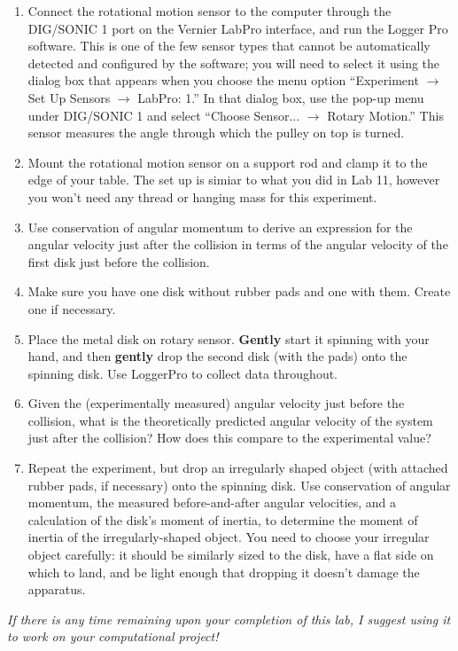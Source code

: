 \documentclass[11pt]{article}
\begin{document}
\begin{enumerate}
\item Connect the rotational motion sensor to the computer through 
the DIG/SONIC 1 port on the Vernier LabPro interface, and run the 
Logger Pro software.  This is one of the few sensor types that cannot be 
automatically detected and configured by the software; you will need to 
select it using the dialog box that appears when you choose the menu option
``Experiment $\rightarrow$ Set Up Sensors $\rightarrow$ LabPro: 1.''  
In that dialog box, use the pop-up menu under DIG/SONIC 1 and 
select ``Choose Sensor... $\rightarrow$ Rotary Motion.''
This sensor measures the angle through which the pulley on top is turned.  

\item Mount the rotational motion sensor on a support rod and clamp it to 
the edge of your table.  The set up is simiar to what you did in Lab 11, however you won't need any thread or hanging mass for this experiment.
\item Use conservation of angular momentum to derive an expression for the angular velocity just after the collision in terms of the  angular velocity of the first disk just before the collision. 
\item Make sure you have one disk without rubber pads and one with them. Create one if necessary.
\item Place the metal disk on rotary sensor. \textbf{Gently} start it spinning with your hand, and then \textbf{gently} drop the second disk (with the pads) onto the spinning disk. Use LoggerPro to collect data throughout.
\item Given the (experimentally measured) angular velocity just before the collision, what is the theoretically predicted angular velocity of the system just after the collision? How does this compare to the experimental value?
\item Repeat the experiment, but drop an irregularly shaped object (with attached rubber pads, if necessary) onto the spinning disk. Use conservation of angular momentum, the measured before-and-after angular velocities, and a calculation of the disk's moment of inertia, to determine the moment of inertia of the irregularly-shaped object. You need to choose your irregular object carefully: it should be similarly sized to the disk, have a flat side on which to land, and be light enough that dropping it doesn't damage the apparatus.
\end{enumerate}

\vspace{1in}

\textit{If there is any time remaining upon your completion of this lab, I suggest using it to work on your computational project!}
\end{document}
